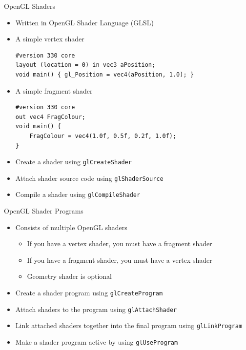 \documentclass{beamer}
\begin{document}
\begin{frame}[fragile]{OpenGL Shaders}
    \begin{itemize}
        \item Written in OpenGL Shader Language (GLSL)
        \item A simple vertex shader
\begin{verbatim}
#version 330 core
layout (location = 0) in vec3 aPosition;
void main() { gl_Position = vec4(aPosition, 1.0); }
\end{verbatim}
        \item A simple fragment shader
\begin{verbatim}
#version 330 core
out vec4 FragColour;
void main() {
    FragColour = vec4(1.0f, 0.5f, 0.2f, 1.0f);
}
\end{verbatim}
        \item Create a shader using {\color{blue}\verb"glCreateShader"}
        \item Attach shader source code using {\color{blue}\verb"glShaderSource"}
        \item Compile a shader using {\color{blue}\verb"glCompileShader"}
    \end{itemize}
\end{frame}

\begin{frame}[fragile]{OpenGL Shader Programs}
    \begin{itemize}
        \item Consists of multiple OpenGL shaders
        \begin{itemize}
            \item If you have a vertex shader, you must have a fragment shader
            \item If you have a fragment shader, you must have a vertex shader
            \item Geometry shader is optional
        \end{itemize}
        \item Create a shader program using {\color{blue}\verb"glCreateProgram"}
        \item Attach shaders to the program using {\color{blue}\verb"glAttachShader"}
        \item Link attached shaders together into the final program using {\color{blue}\verb"glLinkProgram"}
        \item Make a shader program active by using {\color{blue}\verb"glUseProgram"}
    \end{itemize}
\end{frame}
\end{document}
